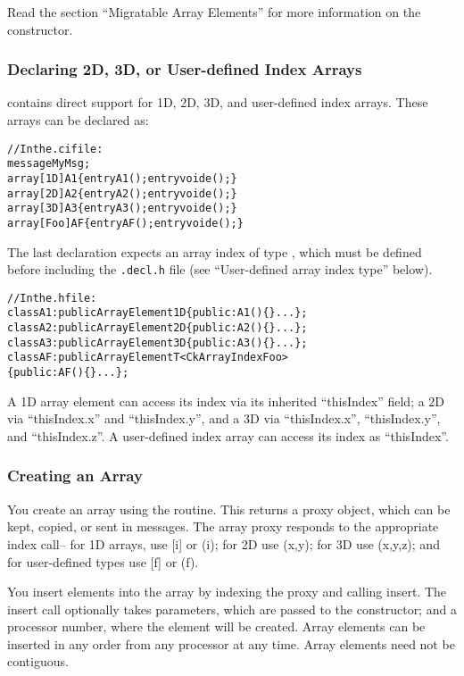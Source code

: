 Read the section ``Migratable Array Elements'' for more
information on the  constructor. 


\subsubsection{Declaring 2D, 3D, or User-defined Index Arrays}

\charmpp{} contains direct support for 1D, 2D, 3D, and user-defined
index arrays.  These arrays can be declared as:

\begin{alltt}
//In the .ci file:
message MyMsg;
array [1D] A1 \{ entry A1(); entry void e();\}
array [2D] A2 \{ entry A2(); entry void e();\}
array [3D] A3 \{ entry A3(); entry void e();\}
array [Foo] AF \{ entry AF(); entry void e();\}
\end{alltt}

The last declaration expects an array index of type ,
which must be defined before including the \texttt{.decl.h} file 
(see ``User-defined array index type'' below).  

\begin{alltt}
//In the .h file:
class A1:public ArrayElement1D \{ public: A1()\{\} ...\};
class A2:public ArrayElement2D \{ public: A2()\{\} ...\};
class A3:public ArrayElement3D \{ public: A3()\{\} ...\};
class AF:public ArrayElementT<CkArrayIndexFoo> 
  \{ public: AF()\{\} ...\};
\end{alltt}

A 1D array element can access its index via its inherited ``thisIndex''
field; a 2D via ``thisIndex.x'' and ``thisIndex.y'', and a 3D via
``thisIndex.x'', ``thisIndex.y'', and ``thisIndex.z''.  A user-defined
index array can access its index as ``thisIndex''.


\subsubsection{Creating an Array}

You create an array using the 
routine.  This returns a proxy object, which can
be kept, copied, or sent in messages.
The array proxy responds to the appropriate index call--
for 1D arrays, use [i] or (i); for 2D use (x,y); for 3D
use (x,y,z); and for user-defined types use [f] or (f).

You insert elements into the array by indexing the proxy
and calling insert.  The insert call optionally takes 
parameters, which are passed to the constructor; and a
processor number, where the element will be created.
Array elements can be inserted in any order from 
any processor at any time.  Array elements need not 
be contiguous.

